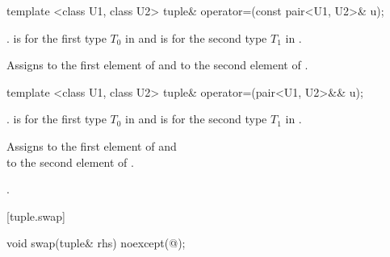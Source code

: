 %
%
%
\begin{itemdecl}
template <class U1, class U2> tuple& operator=(const pair<U1, U2>& u);
\end{itemdecl}

\begin{itemdescr}
\pnum
\requires {}.
 is  for the first type $T_0$ in
 and  is  for the
second type $T_1$ in .

\pnum
\effects  Assigns  to the first element of 
and  to the second element of .

\pnum
\returns  {}
\end{itemdescr}

%
%
%
\begin{itemdecl}
template <class U1, class U2> tuple& operator=(pair<U1, U2>&& u);
\end{itemdecl}

\begin{itemdescr}
\pnum
\requires {}.
 is  for the first type $T_0$ in
 and  is  for the second
type $T_1$ in .

\pnum
\effects Assigns  to the first
element of  and\\  to the
second element of .

\pnum
\returns {}.
\end{itemdescr}

[tuple.swap]{}

\begin{itemdecl}
void swap(tuple& rhs) noexcept(@\seebelow@);
\end{itemdecl}

